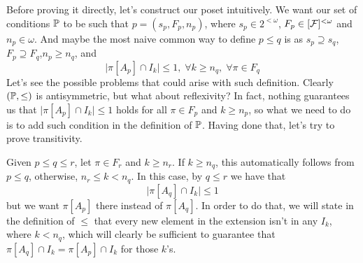 \begin{sketch}
    Before proving it directly, let's construct our poset intuitively. We want our set of conditions $\mathbb{P}$ to be such that $p=(s_p,F_p,n_p)$, where $s_p\in2^{<\omega}$, $F_p\in[\mathcal{F}]^{<\omega}$ and $n_p\in\omega$. And maybe the most naive common way to define $p\leq q$ is as $s_p\supseteq s_q$,$F_p\supseteq F_q$,$n_p\geq n_q$, and
    $$\lvert\pi[A_p]\cap I_k\rvert\leq 1,\;\forall k\geq n_q,\;\forall\pi\in F_q$$
    Let's see the possible problems that could arise with such definition. Clearly $(\mathbb{P},\leq)$ is antisymmetric, but what about reflexivity? In fact, nothing guarantees us that $\lvert\pi[A_p]\cap I_k\rvert\leq 1$ holds for all $\pi\in F_p$ and $k\geq n_p$, so what we need to do is to add such condition in the definition of $\mathbb{P}$. Having done that, let's try to prove transitivity.

    Given $p\leq q\leq r$, let $\pi\in F_r$ and $k\geq n_r$. If $k\geq n_q$, this automatically follows from $p\leq q$, otherwise, $n_r\leq k<n_q$. In this case, by $q\leq r$ we have that
    $$\lvert\pi[A_q]\cap I_k\rvert\leq 1$$
    but we want $\pi[A_p]$ there instead of $\pi[A_q]$. In order to do that, we will state in the definition of $\leq$ that every new element in the extension isn't in any $I_k$, where $k<n_q$, which will clearly be sufficient to guarantee that $\pi[A_q]\cap I_k=\pi[A_p]\cap I_k$ for those $k$'s.
\end{sketch}

